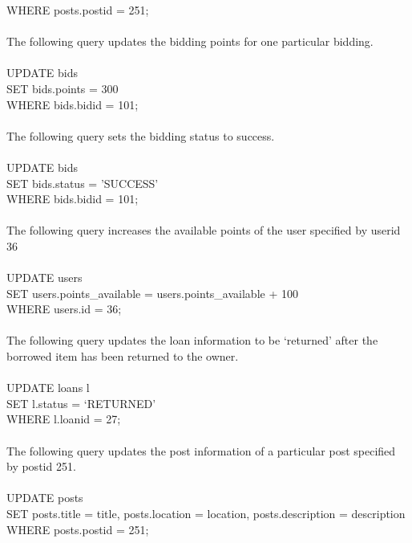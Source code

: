WHERE posts.postid = 251;\\\\
The following query updates the bidding points for one particular bidding.\\\\
UPDATE bids\\
SET bids.points = 300 \\
WHERE bids.bidid = 101;\\\\
The following query sets the bidding status to success.\\\\
UPDATE bids\\
SET bids.status = 'SUCCESS'\\
WHERE bids.bidid = 101;\\\\
The following query increases the available points of the user specified by userid 36\\\\
UPDATE users\\
SET users.points\_available = users.points\_available + 100 \\
WHERE users.id = 36;\\\\
The following query updates the loan information to be `returned' after the borrowed item has been returned to the owner.\\\\
UPDATE loans l\\
SET l.status = `RETURNED'\\
WHERE l.loanid = 27;\\\\
The following query updates the post information of a particular post specified by postid 251.\\\\
UPDATE posts\\
SET posts.title = title, posts.location = location, posts.description = description\\
WHERE posts.postid = 251;

